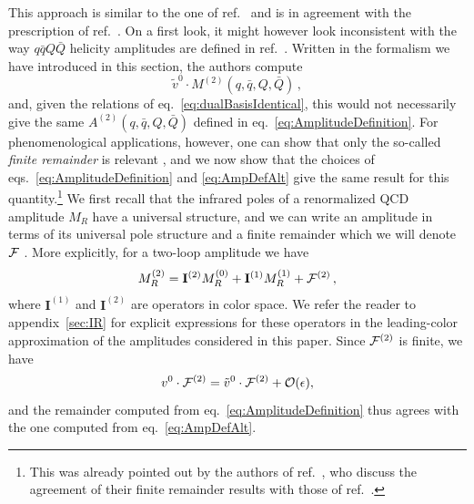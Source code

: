 This approach is similar to the one of
ref.~\cite{Glover:2004si} and is in
agreement with the prescription of ref.~\cite{Anger:2018ove}.
On a first look, it might however look inconsistent with the 
way $q\bar qQ\bar Q$ helicity amplitudes are defined in
ref.~\cite{DeFreitas:2004kmi}. Written in the formalism
we have introduced in this section, the authors compute
\begin{equation}
	\label{eq:AmpDefAlt}
	\tilde v^0\cdot M^{(2)}
	(q,\bar q,Q,\bar Q)\,,
\end{equation}
and, given the relations of eq.~\eqref{eq:dualBasisIdentical}, this
would not necessarily give the same 
$A^{(2)}(q,\bar q,Q,\bar Q)$ defined in 
eq.~\eqref{eq:AmplitudeDefinition}. For
phenomenological applications, however, 
one can show that only the
so-called \emph{finite remainder} is relevant 
\cite{Weinzierl:2011uz},
and we now show that the choices of 
eqs.~\eqref{eq:AmplitudeDefinition} and \eqref{eq:AmpDefAlt}
give the same result for this quantity.\footnote{This was 
already pointed out by the authors of 
ref.~\cite{DeFreitas:2004kmi}, who discuss the agreement of 
their finite remainder results with those of ref.~\cite{Glover:2004si}.}
We first recall that the infrared poles of a renormalized QCD
amplitude $M_R$ have a universal structure, and we can
write an amplitude in terms of its universal pole structure
and a finite remainder
which we will denote $\mathcal{F}$
\cite{Catani:1998bh,Sterman:2002qn,Becher:2009cu,Gardi:2009qi}.
More explicitly, 
for a two-loop amplitude we have
\begin{equation}\label{eq:remainderDef}
	M^{(2)}_R=
	\mathbf{I}^{(2)}M^{(0)}_R
	+\mathbf{I}^{(1)}M^{(1)}_R
	+\mathcal{F}^{(2)}\,,
\end{equation}
where $\mathbf{I}^{(1)}$ and $\mathbf{I}^{(2)}$ are operators in color
space. We refer the reader to appendix~\ref{sec:IR} for 
explicit expressions for these operators in the leading-color
approximation of the amplitudes considered in this paper. Since
$\mathcal{F}^{(2)}$ is finite, we have
\begin{equation}
	v^0\cdot \mathcal{F}^{(2)}
	=\tilde v^0\cdot \mathcal{F}^{(2)}+\mathcal{O}(\epsilon),
        \label{eq:RemainderEquivalence}
\end{equation}
and the remainder computed from 
eq.~\eqref{eq:AmplitudeDefinition} thus agrees with the 
one computed from eq.~\eqref{eq:AmpDefAlt}. 


